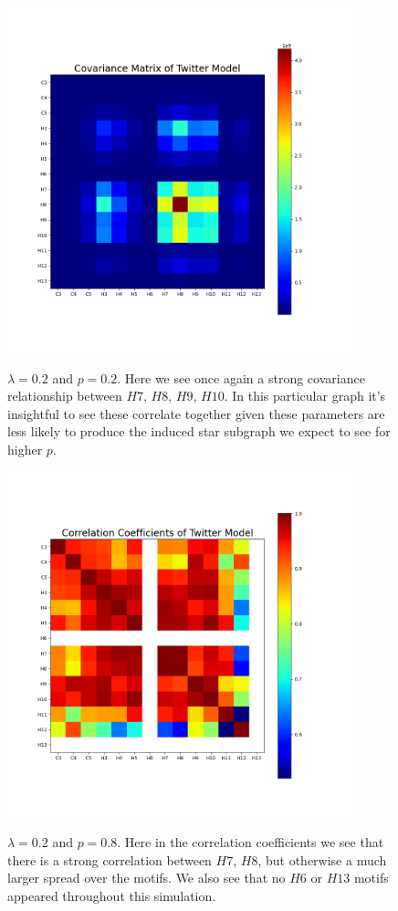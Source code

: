 \begin{figure}
    \includegraphics[width=10cm]{Images/CovMatTwitterModel020209.png}\
    \centering
    \caption{$\lambda=0.2$ and $p=0.2$. Here we see once again 
    a strong covariance relationship between $H7$, $H8$, $H9$, $H10$. In this particular graph 
    it's insightful to see these correlate together given these parameters 
    are less likely to produce the induced star subgraph we expect to see for higher $p$.}
    \label{fig:covmat0202}
\end{figure}

\begin{figure}
    \includegraphics[width=10cm]{Images/CorrCoefTwitterModel020809.png}\
    \centering
    \caption{$\lambda=0.2$ and $p=0.8$. Here in the correlation coefficients we 
    see that there is a strong correlation between $H7$, $H8$, but otherwise a much
    larger spread over the motifs. We also see that no $H6$ or $H13$ motifs appeared
    throughout this simulation.}
\end{figure}

